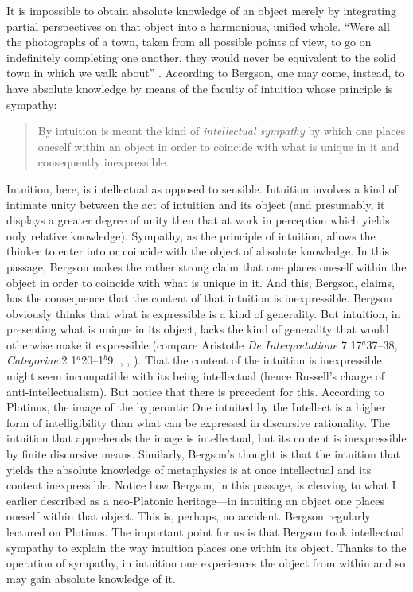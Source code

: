 It is impossible to obtain absolute knowledge of an object merely by integrating partial perspectives on that object into a harmonious, unified whole. ``Were all the photographs of a town, taken from all possible points of view, to go on indefinitely completing one another, they would never be equivalent to the solid town in which we walk about'' \citep[5]{Bergson:1912ud}. According to Bergson, one may come, instead, to have absolute knowledge by means of the faculty of intuition whose principle is sympathy:
\begin{quote}
	By intuition is meant the kind of \emph{intellectual sympathy} by which one places oneself within an object in order to coincide with what is unique in it and consequently inexpressible. \citep[7]{Bergson:1912ud}
\end{quote}
Intuition, here, is intellectual as opposed to sensible. Intuition involves a kind of intimate unity between the act of intuition and its object (and presumably, it displays a greater degree of unity then that at work in perception which yields only relative knowledge). Sympathy, as the principle of intuition, allows the thinker to enter into or coincide with the object of absolute knowledge. In this passage, Bergson makes the rather strong claim that one places oneself within the object in order to coincide with what is unique in it. And this, Bergson, claims, has the consequence that the content of that intuition is inexpressible. Bergson obviously thinks that what is expressible is a kind of generality. But intuition, in presenting what is unique in its object, lacks the kind of generality that would otherwise make it expressible (compare Aristotle \emph{De Interpretatione} 7 17\( ^{a} \)37--38, \emph{Categoriae} 2 1\( ^{a} \)20--1\( ^{b} \)9, \citealt[4]{Frege:1882uq}, \citealt[44]{Prichard:1909yg}, \citealt[52]{Lewis:1929fk}). That the content of the intuition is inexpressible might seem incompatible with its being intellectual (hence Russell's \citeyear{Russell:1912rt} charge of anti-intellectualism). But notice that there is precedent for this. According to Plotinus, the image of the hyperontic One intuited by the Intellect is a higher form of intelligibility than what can be expressed in discursive rationality. The intuition that apprehends the image is intellectual, but its content is inexpressible by finite discursive means. Similarly, Bergson's thought is that the intuition that yields the absolute knowledge of metaphysics is at once intellectual and its content inexpressible. Notice how Bergson, in this passage, is cleaving to what I earlier described as a neo-Platonic heritage---in intuiting an object one places oneself within that object. This is, perhaps, no accident. Bergson regularly lectured on Plotinus. The important point for us is that Bergson took intellectual sympathy to explain the way intuition places one within its object. Thanks to the operation of sympathy, in intuition one experiences the object from within and so may gain absolute knowledge of it.


